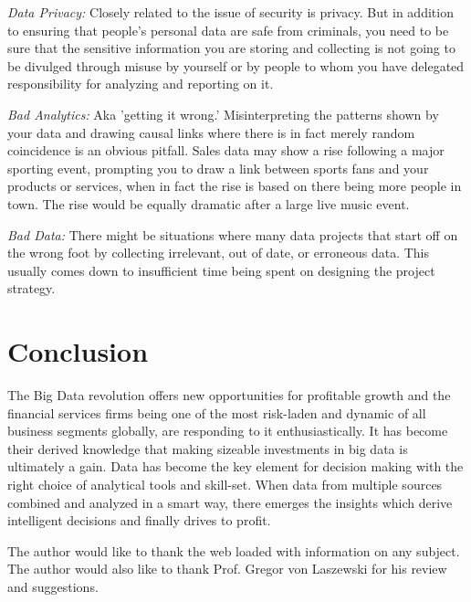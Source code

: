 \documentclass[sigconf]{acmart}
\begin{document}
\textit{Data Privacy:} Closely related to the issue of security is privacy. But in addition to ensuring that people's personal data are safe from criminals, you need to be sure that the sensitive information you are storing and collecting is not going to be divulged through misuse by yourself or by people to whom you have delegated responsibility for analyzing and reporting on it\cite{5risks-bigdata}.

\textit{Bad Analytics:} Aka 'getting it wrong.' Misinterpreting the patterns shown by your data and drawing causal links where there is in fact merely random coincidence is an obvious pitfall. Sales data may show a rise following a major sporting event, prompting you to draw a link between sports fans and your products or services, when in fact the rise is based on there being more people in town. The rise would be equally dramatic after a large live music event\cite{5risks-bigdata}.

\textit{Bad Data:} There might be situations where many data projects that start off on the wrong foot by collecting irrelevant, out of date, or erroneous data. This usually comes down to insufficient time being spent on designing the project strategy\cite{5risks-bigdata}.


\section{Conclusion}
The Big Data revolution offers new opportunities for profitable growth and the financial services firms being one of the most risk-laden and dynamic of all business segments globally, are responding to it enthusiastically. It has become their derived knowledge that making sizeable investments in big data is ultimately a gain. Data has become the key element for decision making with the right choice of analytical tools and skill-set. When data from multiple sources combined and analyzed in a smart way, there emerges the insights which derive intelligent decisions and finally drives to profit.

\begin{acks}

The author would like to thank the web loaded with information on any subject. The author would also like to thank Prof. Gregor von Laszewski for his review and suggestions.

\end{acks}



 
\end{document}
